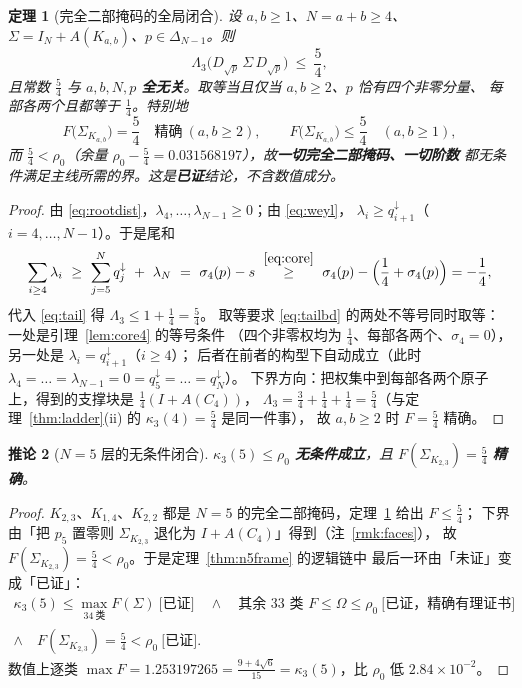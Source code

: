 \documentclass[UTF8,11pt]{ctexart}
\newtheorem{theorem}{定理}[section]
\newtheorem{corollary}[theorem]{推论}
\theoremstyle{definition}
\newcommand{\Lam}{\Lambda}
\begin{document}
\begin{theorem}[完全二部掩码的全局闭合]\label{thm:bipglobal}
设 $a,b\ge1$、$N=a+b\ge4$、$\Sigma=I_N+A(K_{a,b})$、$p\in\Delta_{N-1}$。则
\begin{equation}\label{eq:bipmain}
\Lam_3\bigl(D_{\sqrt p}\,\Sigma\,D_{\sqrt p}\bigr)\ \le\ \frac54 ,
\end{equation}
且常数 $\frac54$ 与 $a,b,N,p$ \textbf{全无关}。取等当且仅当 $a,b\ge2$、$p$ 恰有四个非零分量、
每部各两个且都等于 $\frac14$。特别地
\[
F\bigl(\Sigma_{K_{a,b}}\bigr)=\frac54\quad\textbf{精确}\ (a,b\ge2),\qquad
F\bigl(\Sigma_{K_{a,b}}\bigr)\le\frac54\quad(a,b\ge1),
\]
而 $\frac54<\rho_0$（余量 $\rho_0-\frac54=0.031568197$），故\textbf{一切完全二部掩码、一切阶数}
都无条件满足主线所需的界。这是\textbf{已证}结论，不含数值成分。
\end{theorem}

\begin{proof}
由 \eqref{eq:rootdist}，$\lambda_4,\dots,\lambda_{N-1}\ge0$；由 \eqref{eq:weyl}，
$\lambda_i\ge q^\downarrow_{i+1}$（$i=4,\dots,N-1$）。于是尾和
\begin{equation}\label{eq:tailbd}
\sum_{i\ge4}\lambda_i\ \ge\ \sum_{j=5}^{N}q^\downarrow_j\ +\ \lambda_N
\ =\ \sigma_4(p)-s\ \overset{\eqref{eq:core}}{\ge}\ \sigma_4(p)-\Bigl(\frac14+\sigma_4(p)\Bigr)=-\frac14 ,
\end{equation}
代入 \eqref{eq:tail} 得 $\Lam_3\le1+\frac14=\frac54$。
取等要求 \eqref{eq:tailbd} 的两处不等号同时取等：一处是引理~\ref{lem:core4} 的等号条件
（四个非零权均为 $\frac14$、每部各两个、$\sigma_4=0$），另一处是 $\lambda_i=q^\downarrow_{i+1}$（$i\ge4$）；
后者在前者的构型下自动成立（此时 $\lambda_4=\dots=\lambda_{N-1}=0=q^\downarrow_5=\dots=q^\downarrow_N$）。
下界方向：把权集中到每部各两个原子上，得到的支撑块是 $\frac14(I+A(C_4))$，
$\Lam_3=\frac34+\frac14+\frac14=\frac54$（与定理~\ref{thm:ladder}(ii) 的 $\kappa_3(4)=\frac54$ 是同一件事），
故 $a,b\ge2$ 时 $F=\frac54$ 精确。
\end{proof}

\begin{corollary}[$N=5$ 层的无条件闭合]\label{cor:n5uncond}
$\kappa_3(5)\le\rho_0$ \textbf{无条件成立}，且 $F(\Sigma_{K_{2,3}})=\frac54$ \textbf{精确}。
\end{corollary}

\begin{proof}
$K_{2,3}$、$K_{1,4}$、$K_{2,2}$ 都是 $N=5$ 的完全二部掩码，定理~\ref{thm:bipglobal} 给出 $F\le\frac54$；
下界由「把 $p_5$ 置零则 $\Sigma_{K_{2,3}}$ 退化为 $I+A(C_4)$」得到（注~\ref{rmk:faces}），
故 $F(\Sigma_{K_{2,3}})=\frac54<\rho_0$。于是定理~\ref{thm:n5frame} 的逻辑链中
最后一环由「未证」变成「已证」：
\[
\begin{gathered}
\kappa_3(5)\le\max_{34\ \text{类}}F(\Sigma)\ \textbf{[已证]}\quad\wedge\quad
\text{其余 }33\text{ 类 }F\le\Omega\le\rho_0\ \textbf{[已证，精确有理证书]}\\
\wedge\quad F(\Sigma_{K_{2,3}})=\tfrac54<\rho_0\ \textbf{[已证]} .
\end{gathered}
\]
数值上逐类 $\max F=1.253197265=\frac{9+4\sqrt6}{15}=\kappa_3(5)$，比 $\rho_0$ 低 $2.84\times10^{-2}$。
\end{proof}
\end{document}
